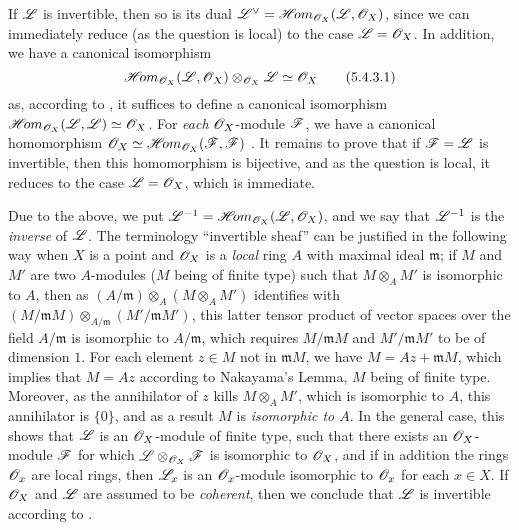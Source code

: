 \begin{env}[5.4.3]
\label{0.5.4.3}
If $\mathscr{L}$ is invertible, then so is its dual ${\mathscr{L}}^\vee=\mathscr{H}\!{om}_{\mathscr{O}_X}(\mathscr{L},\mathscr{O}_X)$, since we can immediately reduce (as the question is local) to the case $\mathscr{L}=\mathscr{O}_X$.
In addition, we have a canonical isomorphism
\[
  \mathscr{H}\!{om}_{\mathscr{O}_X}(\mathscr{L},\mathscr{O}_X)\otimes_{\mathscr{O}_X}\mathscr{L}\simeq\mathscr{O}_X
  \tag{5.4.3.1}
\]
as, according to , it suffices to define a canonical isomorphism $\mathscr{H}\!{om}_{\mathscr{O}_X}(\mathscr{L},\mathscr{L})\simeq\mathscr{O}_X$.
For \emph{each} $\mathscr{O}_X$-module $\mathscr{F}$, we have a canonical homomorphism $\mathscr{O}_X\simeq\mathscr{H}\!{om}_{\mathscr{O}_X}(\mathscr{F},\mathscr{F})$ .
It remains to prove that if $\mathscr{F}=\mathscr{L}$ is invertible, then this homomorphism is bijective, and as the question is local, it reduces to the case $\mathscr{L}=\mathscr{O}_X$, which is immediate.

Due to the above, we put $\mathscr{L}^{-1}=\mathscr{H}\!{om}_{\mathscr{O}_X}(\mathscr{L},\mathscr{O}_X)$, and we say that $\mathscr{L}^{-1}$ is the \emph{inverse} of $\mathscr{L}$.
The terminology ``invertible sheaf'' can be justified in the following way when $X$ is a point and $\mathscr{O}_X$ is a \emph{local} ring $A$ with maximal ideal $\mathfrak{m}$;
if $M$ and $M'$ are two $A$-modules ($M$ being of finite type) such that $M\otimes_A M'$ is isomorphic to $A$, then as $(A/\mathfrak{m})\otimes_A(M\otimes_A M')$ identifies with $(M/\mathfrak{m}M)\otimes_{A/\mathfrak{m}}(M'/\mathfrak{m}M')$, this latter tensor product of vector spaces over the field $A/\mathfrak{m}$ is isomorphic to $A/\mathfrak{m}$, which requires $M/\mathfrak{m}M$ and $M'/\mathfrak{m}M'$ to be of dimension $1$.
For each element $z\in M$ not in $\mathfrak{m}M$, we have $M=Az+\mathfrak{m}M$, which implies that $M=Az$ according to Nakayama's Lemma, $M$ being of finite type.
Moreover, as the annihilator of $z$ kills $M\otimes_A M'$, which is isomorphic to $A$, this annihilator is $\{0\}$, and as a result $M$ is \emph{isomorphic to $A$}.
In the general case, this shows that $\mathscr{L}$ is an $\mathscr{O}_X$-module of finite type, such that there exists an $\mathscr{O}_X$-module $\mathscr{F}$ for which $\mathscr{L}\otimes_{\mathscr{O}_X}\mathscr{F}$ is isomorphic to $\mathscr{O}_X$, and if in addition the rings $\mathscr{O}_x$ are local rings, then $\mathscr{L}_x$ is an $\mathscr{O}_x$-module isomorphic to $\mathscr{O}_x$ for each $x\in X$.
If $\mathscr{O}_X$ and $\mathscr{L}$ are assumed to be \emph{coherent}, then we conclude that $\mathscr{L}$ is invertible according to .
\end{env}


